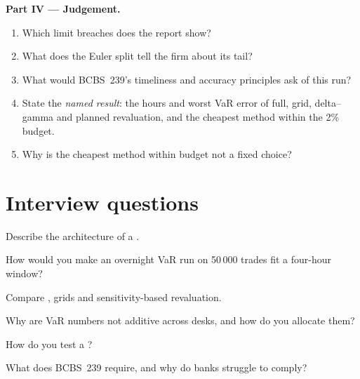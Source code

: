 \begin{problem}
\medskip\noindent\textbf{Part IV --- Judgement.}
\begin{enumerate}[resume]
\item Which limit breaches does the report show?
\item What does the Euler split tell the firm about its tail?
\item What would BCBS~239's timeliness and accuracy principles ask of this run?
\item State the \emph{named result}: the hours and worst VaR error of full, grid, delta--gamma and planned
revaluation, and the cheapest method within the 2\% budget.
\item Why is the cheapest method within budget not a fixed choice?
\end{enumerate}
\end{problem}

\section{Interview questions}

\begin{interviewq}\label{iq:rc:build-a-risk-engine:1}
Describe the architecture of a .
\end{interviewq}

\begin{interviewq}\label{iq:rc:build-a-risk-engine:2}
How would you make an overnight VaR run on 50\,000 trades fit a four-hour window?
\end{interviewq}

\begin{interviewq}\label{iq:rc:build-a-risk-engine:3}
Compare , grids and sensitivity-based revaluation.
\end{interviewq}

\begin{interviewq}\label{iq:rc:build-a-risk-engine:4}
Why are VaR numbers not additive across desks, and how do you allocate them?
\end{interviewq}

\begin{interviewq}\label{iq:rc:build-a-risk-engine:5}
How do you test a ?
\end{interviewq}

\begin{interviewq}\label{iq:rc:build-a-risk-engine:6}
What does BCBS~239 require, and why do banks struggle to comply?
\end{interviewq}
